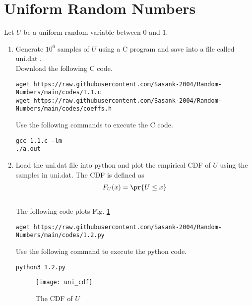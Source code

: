 \documentclass[journal,12pt,twocolumn]{IEEEtran}
\renewcommand\thesection{\arabic{section}}
\begin{document}
\section{Uniform Random Numbers}
Let $U$ be a uniform random variable between 0 and 1.
\begin{enumerate}[label=\thesection.\arabic*
,ref=\thesection.\theenumi]
\item Generate $10^6$ samples of $U$ using a C program and save into a file called uni.dat .
\\
\solution Download the following  C code.
\begin{lstlisting}
wget https://raw.githubusercontent.com/Sasank-2004/Random-Numbers/main/codes/1.1.c
wget https://raw.githubusercontent.com/Sasank-2004/Random-Numbers/main/codes/coeffs.h
\end{lstlisting}
Use the following commands to execute the C code.
\begin{lstlisting}
gcc 1.1.c -lm
./a.out 
\end{lstlisting}
%
\item
Load the uni.dat file into python and plot the empirical CDF of $U$ using the samples in uni.dat. The CDF is defined as
\begin{align}
F_{U}(x) = \pr{U \le x}
\end{align}
\\
\solution  The following code plots Fig. \ref{fig:uni_cdf}
\begin{lstlisting}
wget https://raw.githubusercontent.com/Sasank-2004/Random-Numbers/main/codes/1.2.py
\end{lstlisting}
Use the following command to execute the python code.
\begin{lstlisting}
python3 1.2.py
\end{lstlisting}
\begin{figure}[h]
\centering
\texttt{[image: uni\_cdf]}
\caption{The CDF of $U$}
\label{fig:uni_cdf}
\end{figure}


\end{enumerate}
\end{document}
